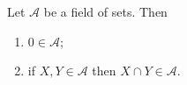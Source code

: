 Let $\mathcal{A}$ be a field of sets. Then

\begin{enumerate}
\item[(i)] $0 \in \mathcal{A}$;
\item[(ii)] if $X, Y \in \mathcal{A}$ then $X \cap Y \in \mathcal{A}$.
\end{enumerate}
